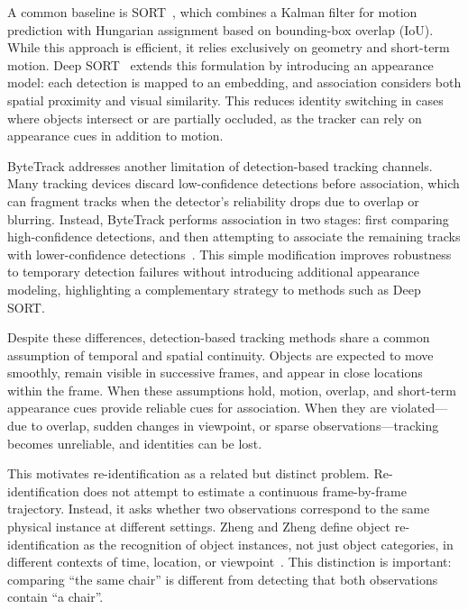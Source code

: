 A common baseline is SORT~\cite{bewley_simple_2016}, which combines a Kalman filter for motion prediction with Hungarian assignment based on bounding-box overlap (IoU). While this approach is efficient, it relies exclusively on geometry and short-term motion. Deep SORT~\cite{wojke_simple_2017} extends this formulation by introducing an appearance model: each detection is mapped to an embedding, and association considers both spatial proximity and visual similarity. This reduces identity switching in cases where objects intersect or are partially occluded, as the tracker can rely on appearance cues in addition to motion.

ByteTrack addresses another limitation of detection-based tracking channels. Many tracking devices discard low-confidence detections before association, which can fragment tracks when the detector's reliability drops due to overlap or blurring. Instead, ByteTrack performs association in two stages: first comparing high-confidence detections, and then attempting to associate the remaining tracks with lower-confidence detections~\cite{zhang_bytetrack_2022}. This simple modification improves robustness to temporary detection failures without introducing additional appearance modeling, highlighting a complementary strategy to methods such as Deep SORT.

Despite these differences, detection-based tracking methods share a common assumption of temporal and spatial continuity. Objects are expected to move smoothly, remain visible in successive frames, and appear in close locations within the frame. When these assumptions hold, motion, overlap, and short-term appearance cues provide reliable cues for association. When they are violated—due to overlap, sudden changes in viewpoint, or sparse observations—tracking becomes unreliable, and identities can be lost.


This motivates re-identification as a related but distinct problem. Re-identification does not attempt to estimate a continuous frame-by-frame trajectory. Instead, it asks whether two observations correspond to the same physical instance at different settings. Zheng and Zheng define object re-identification as the recognition of object instances, not just object categories, in different contexts of time, location, or viewpoint~\cite{zheng_object_2024}. This distinction is important: comparing \enquote{the same chair} is different from detecting that both observations contain \enquote{a chair}.

